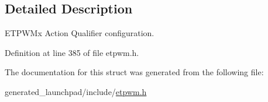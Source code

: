 \subsection{Detailed Description}
E\+T\+P\+W\+Mx Action Qualifier configuration. 

Definition at line 385 of file etpwm.\+h.



The documentation for this struct was generated from the following file\+:\begin{DoxyCompactItemize}
\item 
generated\+\_\+launchpad/include/\mbox{\hyperlink{etpwm_8h}{etpwm.\+h}}\end{DoxyCompactItemize}
